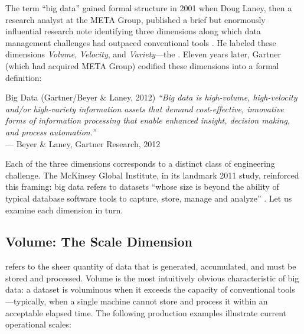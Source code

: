 The term ``big data'' gained formal structure in 2001 when Doug Laney,
then a research analyst at the META Group, published a brief but
enormously influential research note identifying three dimensions along
which data management challenges had outpaced conventional tools
\parencite{Laney2001}. He labeled these dimensions \emph{Volume},
\emph{Velocity}, and \emph{Variety}---the . Eleven
years later, Gartner (which had acquired META Group) codified these
dimensions into a formal definition:

\begin{defbox}{Big Data (Gartner/Beyer \& Laney, 2012)}
\textit{``Big data is high-volume, high-velocity and/or high-variety
information assets that demand cost-effective, innovative forms of
information processing that enable enhanced insight, decision making,
and process automation.''}\\[4pt]
\hfill --- Beyer \& Laney, Gartner Research, 2012 \parencite{GartnerBigData2012}
\end{defbox}

Each of the three dimensions corresponds to a distinct class of
engineering challenge. The McKinsey Global Institute, in its landmark
2011 study, reinforced this framing: big data refers to datasets
``whose size is beyond the ability of typical database software tools to
capture, store, manage and analyze'' \parencite{McKinsey2011}. Let us
examine each dimension in turn.

\subsection{Volume: The Scale Dimension}
\label{subsec:volume}

 refers to the sheer quantity of data that is generated,
accumulated, and must be stored and processed. Volume is the most
intuitively obvious characteristic of big data: a dataset is voluminous
when it exceeds the capacity of conventional tools---typically, when a
single machine cannot store and process it within an acceptable elapsed
time. The following production examples illustrate current operational
scales:

